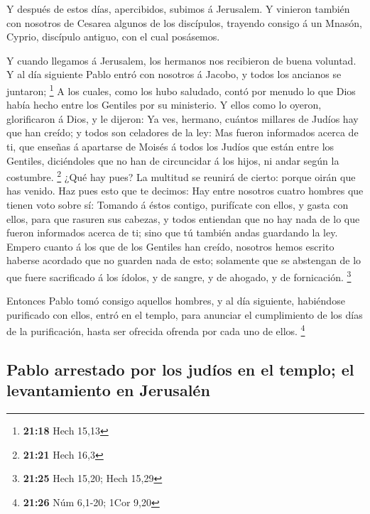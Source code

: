  Y después de estos días, apercibidos, subimos á
Jerusalem.  Y vinieron también con nosotros de Cesarea
algunos de los discípulos, trayendo consigo á un Mnasón, Cyprio,
discípulo antiguo, con el cual posásemos.

 Y cuando llegamos á Jerusalem, los hermanos nos
recibieron de buena voluntad.  Y al día siguiente Pablo
entró con nosotros á Jacobo, y todos los ancianos se juntaron;
\footnote{\textbf{21:18} Hech 15,13}  A los cuales, como
los hubo saludado, contó por menudo lo que Dios había hecho entre los
Gentiles por su ministerio.  Y ellos como lo oyeron,
glorificaron á Dios, y le dijeron: Ya ves, hermano, cuántos millares de
Judíos hay que han creído; y todos son celadores de la ley:
 Mas fueron informados acerca de ti, que enseñas á
apartarse de Moisés á todos los Judíos que están entre los Gentiles,
diciéndoles que no han de circuncidar á los hijos, ni andar según la
costumbre. \footnote{\textbf{21:21} Hech 16,3}  ¿Qué hay
pues? La multitud se reunirá de cierto: porque oirán que has venido.
 Haz pues esto que te decimos: Hay entre nosotros cuatro
hombres que tienen voto sobre sí:  Tomando á éstos
contigo, purifícate con ellos, y gasta con ellos, para que rasuren sus
cabezas, y todos entiendan que no hay nada de lo que fueron informados
acerca de ti; sino que tú también andas guardando la ley.
 Empero cuanto á los que de los Gentiles han creído,
nosotros hemos escrito haberse acordado que no guarden nada de esto;
solamente que se abstengan de lo que fuere sacrificado á los ídolos, y
de sangre, y de ahogado, y de fornicación. \footnote{\textbf{21:25} Hech
  15,20; Hech 15,29}

 Entonces Pablo tomó consigo aquellos hombres, y al día
siguiente, habiéndose purificado con ellos, entró en el templo, para
anunciar el cumplimiento de los días de la purificación, hasta ser
ofrecida ofrenda por cada uno de ellos. \footnote{\textbf{21:26} Núm
  6,1-20; 1Cor 9,20}

\hypertarget{pablo-arrestado-por-los-juduxedos-en-el-templo-el-levantamiento-en-jerusaluxe9n}{%
\subsection{Pablo arrestado por los judíos en el templo; el
levantamiento en
Jerusalén}\label{pablo-arrestado-por-los-juduxedos-en-el-templo-el-levantamiento-en-jerusaluxe9n}}

